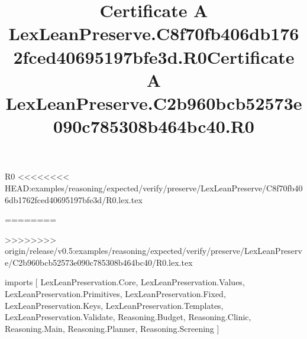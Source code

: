 \begin{lexlean}{R0}
<<<<<<<< HEAD:examples/reasoning/expected/verify/preserve/LexLeanPreserve/C8f70fb406db1762fced40695197bfe3d/R0.lex.tex
\title{Certificate A LexLeanPreserve.C8f70fb406db1762fced40695197bfe3d.R0}
========
\title{Certificate A LexLeanPreserve.C2b960bcb52573e090c785308b464bc40.R0}
>>>>>>>> origin/release/v0.5:examples/reasoning/expected/verify/preserve/LexLeanPreserve/C2b960bcb52573e090c785308b464bc40/R0.lex.tex
\begin{coremodule}
imports [
  LexLeanPreservation.Core,
  LexLeanPreservation.Values,
  LexLeanPreservation.Primitives,
  LexLeanPreservation.Fixed,
  LexLeanPreservation.Keys,
  LexLeanPreservation.Templates,
  LexLeanPreservation.Validate,
  Reasoning.Budget,
  Reasoning.Clinic,
  Reasoning.Main,
  Reasoning.Planner,
  Reasoning.Screening
]


\end{coremodule}
\end{lexlean}
